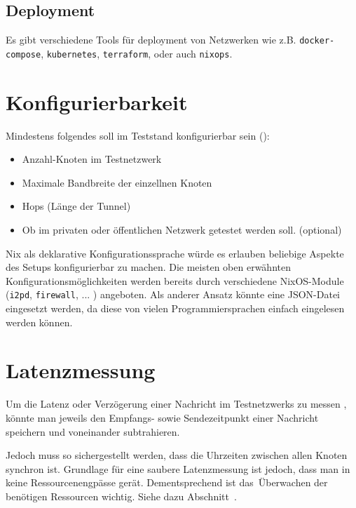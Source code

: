 \subsection{Deployment}


Es gibt verschiedene Tools für deployment von Netzwerken wie z.B. \lstinline|docker-compose|, \lstinline|kubernetes|, \lstinline|terraform|, oder auch \lstinline|nixops|.


\section{Konfigurierbarkeit}

Mindestens folgendes soll im Teststand konfigurierbar sein ():

\begin{itemize}
    \item Anzahl-Knoten im Testnetzwerk
    \item Maximale Bandbreite der einzellnen Knoten
    \item Hops (Länge der Tunnel)
    \item Ob im privaten oder öffentlichen Netzwerk getestet werden soll. (optional)
\end{itemize}

Nix als deklarative Konfigurationssprache würde es erlauben beliebige Aspekte des Setups konfigurierbar zu machen.
Die meisten oben erwähnten Konfigurationsmöglichkeiten werden bereits durch verschiedene NixOS-Module (\lstinline|i2pd|, \lstinline|firewall|, ... ) angeboten. Als anderer Ansatz könnte eine JSON-Datei eingesetzt werden, da diese von vielen Programmiersprachen einfach eingelesen werden können.

\section{Latenzmessung}

Um die Latenz oder Verzögerung einer Nachricht im Testnetzwerks zu messen , könnte man jeweils den Empfangs- sowie Sendezeitpunkt einer Nachricht speichern und voneinander subtrahieren.


Jedoch muss so sichergestellt werden, dass die Uhrzeiten zwischen allen Knoten synchron ist.
Grundlage für eine saubere Latenzmessung ist jedoch, dass man in keine Ressourcenengpässe gerät.
Dementsprechend ist das Überwachen der benötigen Ressourcen wichtig. Siehe dazu Abschnitt~.

